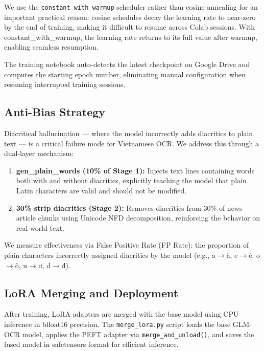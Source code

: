 \documentclass[11pt]{article}
\begin{document}
We use the \texttt{constant\_with\_warmup} scheduler rather than cosine annealing for an important practical reason: cosine schedules decay the learning rate to near-zero by the end of training, making it difficult to resume across Colab sessions. 
With constant\_with\_warmup, the learning rate returns to its full value after warmup, enabling seamless resumption.

The training notebook auto-detects the latest checkpoint on Google Drive and computes the starting epoch number, eliminating manual configuration when resuming interrupted training sessions.

\subsection{Anti-Bias Strategy}

Diacritical hallucination --- where the model incorrectly adds diacritics to plain text --- is a critical failure mode for Vietnamese OCR. 
We address this through a dual-layer mechanism:

\begin{enumerate}[nosep]
    \item \textbf{gen\_plain\_words (10\% of Stage 1):} Injects text lines containing words both with and without diacritics, explicitly teaching the model that plain Latin characters are valid and should not be modified.
    \item \textbf{30\% strip diacritics (Stage 2):} Removes diacritics from 30\% of news article chunks using Unicode NFD decomposition, reinforcing the behavior on real-world text.
\end{enumerate}

We measure effectiveness via False Positive Rate (FP Rate): the proportion of plain characters incorrectly assigned diacritics by the model (e.g., a$\rightarrow$ă, e$\rightarrow$ê, o$\rightarrow$ô, u$\rightarrow$ư, d$\rightarrow$đ).

\subsection{LoRA Merging and Deployment}

After training, LoRA adapters are merged with the base model using CPU inference in bfloat16 precision. 
The \texttt{merge\_lora.py} script loads the base GLM-OCR model, applies the PEFT adapter via \texttt{merge\_and\_unload()}, and saves the fused model in safetensors format for efficient inference.
\end{document}
